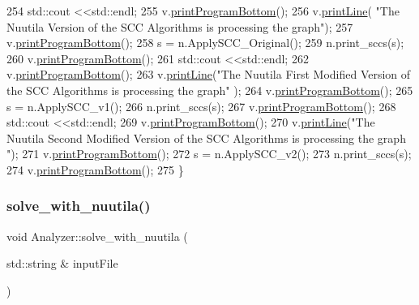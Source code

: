 \begin{DoxyCode}
254     std::cout <<std::endl;
255     v.\hyperlink{class_visualize_ac0be9ece2d80a7d1e34724fb87424216}{printProgramBottom}();
256     v.\hyperlink{class_visualize_abce6cd538dc0715b21851e0bf0377d85}{printLine}( \textcolor{stringliteral}{"The Nuutila Version of the SCC Algorithms is processing the graph"});
257     v.\hyperlink{class_visualize_ac0be9ece2d80a7d1e34724fb87424216}{printProgramBottom}();
258     s = n.ApplySCC\_Original();
259     n.print\_sccs(s);
260     v.\hyperlink{class_visualize_ac0be9ece2d80a7d1e34724fb87424216}{printProgramBottom}();
261     std::cout <<std::endl;
262     v.\hyperlink{class_visualize_ac0be9ece2d80a7d1e34724fb87424216}{printProgramBottom}();
263     v.\hyperlink{class_visualize_abce6cd538dc0715b21851e0bf0377d85}{printLine}(\textcolor{stringliteral}{"The Nuutila First Modified Version of the SCC Algorithms is processing the graph"}
      );
264     v.\hyperlink{class_visualize_ac0be9ece2d80a7d1e34724fb87424216}{printProgramBottom}();
265     s = n.ApplySCC\_v1();
266     n.print\_sccs(s);
267     v.\hyperlink{class_visualize_ac0be9ece2d80a7d1e34724fb87424216}{printProgramBottom}();
268     std::cout <<std::endl;
269     v.\hyperlink{class_visualize_ac0be9ece2d80a7d1e34724fb87424216}{printProgramBottom}();
270     v.\hyperlink{class_visualize_abce6cd538dc0715b21851e0bf0377d85}{printLine}(\textcolor{stringliteral}{"The Nuutila Second Modified Version of the SCC Algorithms is processing the graph
      "});
271     v.\hyperlink{class_visualize_ac0be9ece2d80a7d1e34724fb87424216}{printProgramBottom}();
272     s = n.ApplySCC\_v2();
273     n.print\_sccs(s);
274     v.\hyperlink{class_visualize_ac0be9ece2d80a7d1e34724fb87424216}{printProgramBottom}();
275 \}
\end{DoxyCode}
\mbox{\label{class_analyzer_a5ac77dbb2bbea6b34af561272705d64e}} 
\subsubsection{\texorpdfstring{solve\+\_\+with\+\_\+nuutila()}{solve\_with\_nuutila()}}
{\footnotesize\ttfamily void Analyzer\+::solve\+\_\+with\+\_\+nuutila (\begin{DoxyParamCaption}\item[{std\+::string \&}]{input\+File }\end{DoxyParamCaption})}



